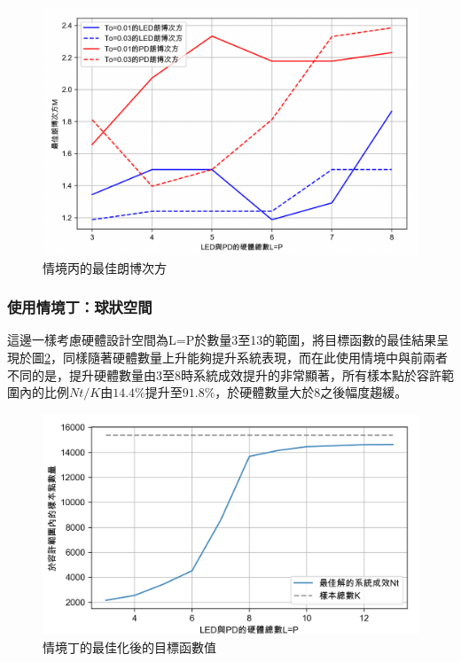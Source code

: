     \begin{figure}[htpb]
        \centering
        \includegraphics[width=13cm]{ch5pic/c_opt_m.png}
        \caption{情境丙的最佳朗博次方}
        \label{pic:c_opt_m}
    \end{figure}

    


    \subsubsection{使用情境丁：球狀空間}
    \label{chp:optimiza_D}

    這邊一樣考慮硬體設計空間為L=P於數量3至13的範圍，將目標函數的最佳結果呈現於圖\ref{pic:opt_D}，同樣隨著硬體數量上升能夠提升系統表現，而在此使用情境中與前兩者不同的是，提升硬體數量由3至8時系統成效提升的非常顯著，所有樣本點於容許範圍內的比例$Nt/K$由$14.4\%$提升至$91.8\%$，於硬體數量大於8之後幅度趨緩。

    \begin{figure}[htpb]
        \centering
        \includegraphics[width=13cm]{ch5pic/optimize_d.png}
        \caption{情境丁的最佳化後的目標函數值}
        \label{pic:opt_D}
    \end{figure}


